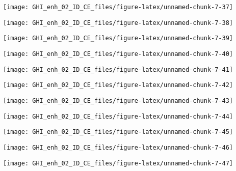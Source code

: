 \documentclass[
  10pt,
  a4paper,oneside]{article}
\begin{document}
\begin{center}\texttt{[image: GHI\_enh\_02\_ID\_CE\_files/figure-latex/unnamed-chunk-7-37]} \end{center}

\begin{center}\texttt{[image: GHI\_enh\_02\_ID\_CE\_files/figure-latex/unnamed-chunk-7-38]} \end{center}

\begin{center}\texttt{[image: GHI\_enh\_02\_ID\_CE\_files/figure-latex/unnamed-chunk-7-39]} \end{center}

\begin{center}\texttt{[image: GHI\_enh\_02\_ID\_CE\_files/figure-latex/unnamed-chunk-7-40]} \end{center}

\begin{center}\texttt{[image: GHI\_enh\_02\_ID\_CE\_files/figure-latex/unnamed-chunk-7-41]} \end{center}

\begin{center}\texttt{[image: GHI\_enh\_02\_ID\_CE\_files/figure-latex/unnamed-chunk-7-42]} \end{center}

\begin{center}\texttt{[image: GHI\_enh\_02\_ID\_CE\_files/figure-latex/unnamed-chunk-7-43]} \end{center}

\begin{center}\texttt{[image: GHI\_enh\_02\_ID\_CE\_files/figure-latex/unnamed-chunk-7-44]} \end{center}

\begin{center}\texttt{[image: GHI\_enh\_02\_ID\_CE\_files/figure-latex/unnamed-chunk-7-45]} \end{center}

\begin{center}\texttt{[image: GHI\_enh\_02\_ID\_CE\_files/figure-latex/unnamed-chunk-7-46]} \end{center}

\begin{center}\texttt{[image: GHI\_enh\_02\_ID\_CE\_files/figure-latex/unnamed-chunk-7-47]} \end{center}
\end{document}
